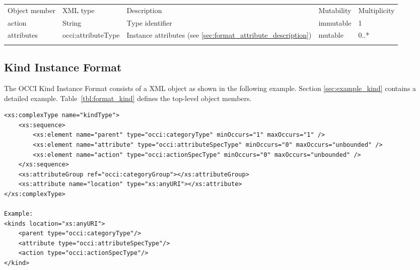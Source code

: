 \documentclass[10pt,a4paper]{article}
\begin{document}
 {
    \begin{tabularx}{\textwidth}{llXll}
    \toprule
    Object member & XML type & Description & Mutability & Multiplicity \\
    \colrule
    action & String & Type identifier & immutable & 1 \\

    attributes & occi:attributeType & Instance attributes (see
\ref{sec:format_attribute_description}) & mutable & 0..* \\
    \botrule
    \end{tabularx}
}

\subsection{Kind Instance Format}
\label{sec:format_kind}

The OCCI Kind Instance Format consists of a XML object as shown in the
following example. Section \ref{sec:example_kind} contains a detailed example.
Table~\ref{tbl:format_kind} defines the top-level object members.
\begin{lstlisting}
<xs:complexType name="kindType">
	<xs:sequence>
		<xs:element name="parent" type="occi:categoryType" minOccurs="1" maxOccurs="1" />
		<xs:element name="attribute" type="occi:attributeSpecType" minOccurs="0" maxOccurs="unbounded" />
		<xs:element name="action" type="occi:actionSpecType" minOccurs="0" maxOccurs="unbounded" />
	</xs:sequence>
	<xs:attributeGroup ref="occi:categoryGroup"></xs:attributeGroup>
	<xs:attribute name="location" type="xs:anyURI"></xs:attribute>
</xs:complexType>

Example:
<kinds location="xs:anyURI">
	<parent type="occi:categoryType"/>
	<attribute type="occi:attributeSpecType"/>
	<action type="occi:actionSpecType"/>
</kind>
\end{lstlisting}
\end{document}
